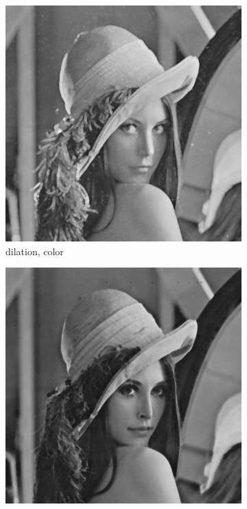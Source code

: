 \begin{figure}[!ht]
   \centering
\begin{subfigure}[t]{0.22\textwidth}
    \includegraphics[width=0.9\linewidth]{../project/images/outputs/compare_gray/dilation.png}
    \caption{dilation, color}
    \centering
  \end{subfigure}
\begin{subfigure}[t]{0.22\textwidth}
    \includegraphics[width=0.9\linewidth]{../project/images/outputs/compare_gray/erosion.png}

\end{subfigure}
\end{figure}
